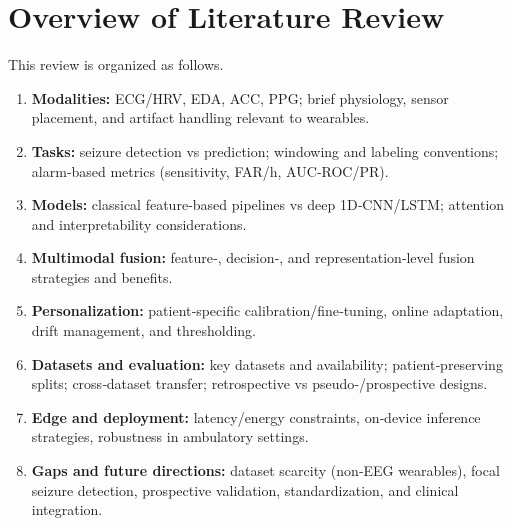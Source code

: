 \section{Overview of Literature Review}
This review is organized as follows.
\begin{enumerate}
    \item \textbf{Modalities:} ECG/HRV, EDA, ACC, PPG; brief physiology, sensor placement, and artifact handling relevant to wearables.
    \item \textbf{Tasks:} seizure detection vs prediction; windowing and labeling conventions; alarm‑based metrics (sensitivity, FAR/h, AUC‑ROC/PR).
    \item \textbf{Models:} classical feature‑based pipelines vs deep 1D‑CNN/LSTM; attention and interpretability considerations.
    \item \textbf{Multimodal fusion:} feature‑, decision‑, and representation‑level fusion strategies and benefits.
    \item \textbf{Personalization:} patient‑specific calibration/fine‑tuning, online adaptation, drift management, and thresholding.
    \item \textbf{Datasets and evaluation:} key datasets and availability; patient‑preserving splits; cross‑dataset transfer; retrospective vs pseudo‑/prospective designs.
    \item \textbf{Edge and deployment:} latency/energy constraints, on‑device inference strategies, robustness in ambulatory settings.
    \item \textbf{Gaps and future directions:} dataset scarcity (non‑EEG wearables), focal seizure detection, prospective validation, standardization, and clinical integration.
\end{enumerate}